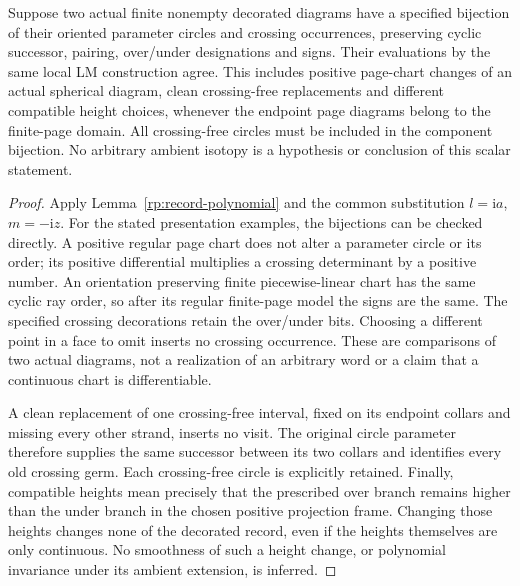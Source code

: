 \begin{lemma}
\label{lc:presentations}\leanok
Suppose two actual finite nonempty decorated diagrams have a specified
bijection of their oriented parameter circles and crossing occurrences,
preserving cyclic successor, pairing, over/under designations and signs.
Their evaluations by the same local LM construction agree. This includes
positive page-chart changes of an actual spherical diagram, clean
crossing-free replacements and different compatible height choices,
whenever the endpoint page diagrams belong to the finite-page domain.
All crossing-free circles must be included in the component bijection.
No arbitrary ambient isotopy is a hypothesis or conclusion of this scalar
statement.

\end{lemma}
\begin{proof}\leanok{}
Apply Lemma~\ref{rp:record-polynomial} and the common substitution
$l=\mathrm ia$, $m=-\mathrm iz$. For the stated presentation examples,
the bijections can be checked directly. A positive regular page chart
does not alter a parameter circle or its order; its positive differential
multiplies a crossing determinant by a positive number. An orientation
preserving finite piecewise-linear chart has the same cyclic ray order,
so after its regular finite-page model the signs are the same. The
specified crossing decorations retain the over/under bits. Choosing a
different point in a face to omit inserts no crossing occurrence.
These are comparisons of two actual diagrams, not a realization of an
arbitrary word or a claim that a continuous chart is differentiable.

A clean replacement of one crossing-free interval, fixed on its endpoint
collars and missing every other strand, inserts no visit. The original
circle parameter therefore supplies the same successor between its two
collars and identifies every old crossing germ. Each crossing-free circle
is explicitly retained. Finally, compatible heights mean precisely that
the prescribed over branch remains higher than the under branch in the
chosen positive projection frame. Changing those heights changes none
of the decorated record, even if the heights themselves are only
continuous. No smoothness of such a height change, or polynomial
invariance under its ambient extension, is inferred.
\end{proof}

